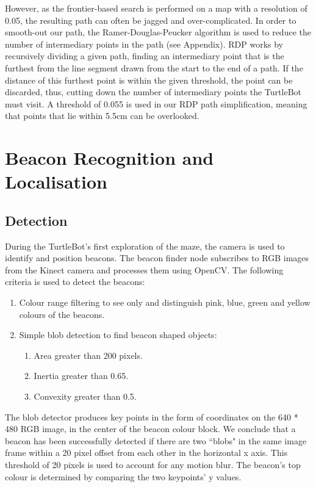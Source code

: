 \documentclass[titlepage,12pt,a4paper]{article}
\begin{document}
However, as the frontier-based search is performed on a map with a resolution of 0.05, the resulting path can often be jagged and over-complicated. In order to smooth-out our path, the Ramer-Douglas-Peucker algorithm is used to reduce the number of intermediary points in the path (see Appendix). RDP works by recursively dividing a given path, finding an intermediary point that is the furthest from the line segment drawn from the start to the end of a path. If the distance of this furthest point is within the given threshold, the point can be discarded, thus, cutting down the number of intermediary points the TurtleBot must visit. A threshold of 0.055 is used in our RDP path simplification, meaning that points that lie within 5.5cm can be overlooked.

\pagebreak
\section{Beacon Recognition and Localisation}

\subsection{Detection}
During the TurtleBot's first exploration of the maze, the camera is used to identify and position beacons. The beacon finder node subscribes to RGB images from the Kinect camera and processes them using OpenCV. The following criteria is used to detect the beacons:

    \begin{enumerate}
        \item Colour range filtering to see only and distinguish pink, blue, green and yellow colours of the beacons.
        \item Simple blob detection to find beacon shaped objects:
        \begin{enumerate}
            \item Area greater than 200 pixels.
            \item Inertia greater than 0.65.
            \item Convexity greater than 0.5.
        \end{enumerate}
    \end{enumerate}

The blob detector produces key points in the form of coordinates on the 640 * 480 RGB image, in the center of the beacon colour block. We conclude that a beacon has been successfully detected if there are two ``blobs" in the same image frame within a 20 pixel offset from each other in the horizontal x axis. This threshold of 20 pixels is used to account for any motion blur. The beacon's top colour is determined by comparing the two keypoints' y values.
\end{document}
